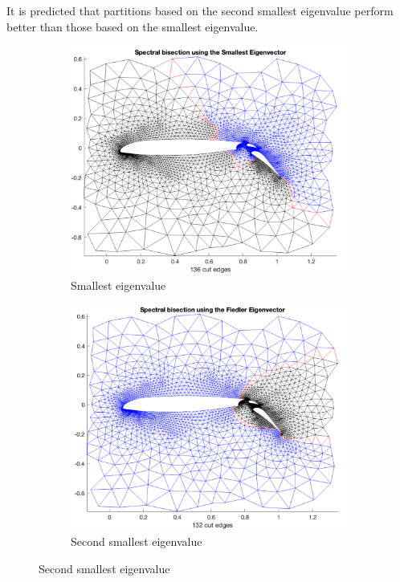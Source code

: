 \documentclass[unicode,11pt,a4paper,oneside,numbers=endperiod,openany]{scrartcl}
\begin{document}
It is predicted that partitions based on the second smallest eigenvalue perform better than those based on the smallest eigenvalue.
\begin{figure}[htbp]
    \centering
    
    \begin{subfigure}[b]{0.4\textwidth}
        \includegraphics[width=\textwidth]{images/smallest eigenvalue.png}
        \caption{Smallest eigenvalue}
    \end{subfigure}
    \hfill
    \begin{subfigure}[b]{0.4\textwidth}
        \includegraphics[width=\textwidth]{images/Secondsmallest.png}
        \caption{Second smallest eigenvalue} 
    \end{subfigure}
    
\end{figure}
\end{document}
